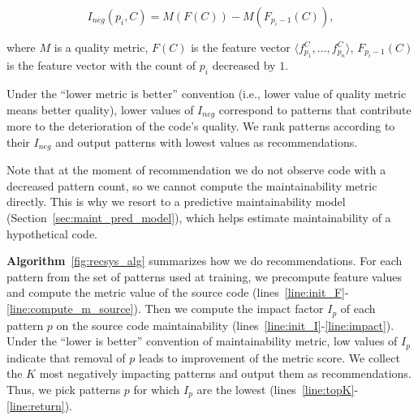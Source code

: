 \begin{equation} \label{eq:impact_factor} I_{\textit{neg}}(p_i, C) = M(F(C)) -
M(F_{p_{i} - 1}(C)), \end{equation}

where $M$ is a quality metric, $F(C)$ is the feature vector $\langle f^C_{p_1},
..., f^C_{p_n} \rangle$, $F_{p_{i} - 1}(C)$ is the feature vector with the count
of $p_i$ decreased by $1$.%


Under the ``lower metric is better'' convention (i.e., lower value of quality metric
means better quality), lower values of $I_{\textit{neg}}$ correspond to patterns
that contribute more to the deterioration of the code's quality. We rank patterns
according to their $I_{\textit{neg}}$ and output patterns with lowest values as
recommendations.

Note that at the moment of recommendation we do not observe code with a
decreased pattern count, so we cannot compute the maintainability metric
directly. This is why we resort to a predictive maintainability model
(Section~\ref{sec:maint_pred_model}), which helps estimate maintainability of a
hypothetical code.



\textbf{Algorithm}~\ref{fig:recsys_alg} summarizes how we do recommendations.
For each pattern from the set of patterns used at training, we
precompute feature values and compute the metric value of the source code
(lines~\ref{line:init_F}-\ref{line:compute_m_source}). Then we compute the
impact factor $I_p$ of each pattern $p$ on the source code maintainability
(lines~\ref{line:init_I}-\ref{line:impact}). Under the ``lower is better''
convention of maintainability metric, low values of $I_p$ indicate that removal
of $p$ leads to improvement of the metric score. We collect the $K$ most
negatively impacting patterns and output them as recommendations. Thus, we
pick patterns $p$ for which $I_p$ are the lowest
(lines~\ref{line:topK}-\ref{line:return}).

